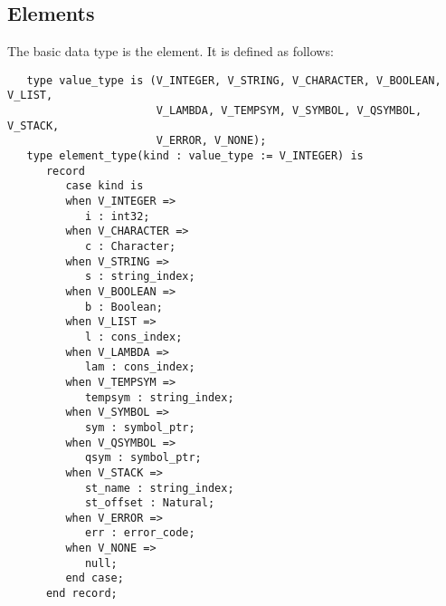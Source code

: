 \documentclass[10pt, openany]{book}
\begin{document}
\subsection{Elements}
The basic data type is the element.  It is defined as follows:
\lstset{language=Ada}
\begin{lstlisting}
   type value_type is (V_INTEGER, V_STRING, V_CHARACTER, V_BOOLEAN, V_LIST,
                       V_LAMBDA, V_TEMPSYM, V_SYMBOL, V_QSYMBOL, V_STACK,
                       V_ERROR, V_NONE);
   type element_type(kind : value_type := V_INTEGER) is
      record
         case kind is
         when V_INTEGER =>
            i : int32;
         when V_CHARACTER =>
            c : Character;
         when V_STRING =>
            s : string_index;
         when V_BOOLEAN =>
            b : Boolean;
         when V_LIST =>
            l : cons_index;
         when V_LAMBDA =>
            lam : cons_index;
         when V_TEMPSYM =>
            tempsym : string_index;
         when V_SYMBOL =>
            sym : symbol_ptr;
         when V_QSYMBOL =>
            qsym : symbol_ptr;
         when V_STACK =>
            st_name : string_index;
            st_offset : Natural;
         when V_ERROR =>
            err : error_code;
         when V_NONE =>
            null;
         end case;
      end record;
\end{lstlisting}
\end{document}
